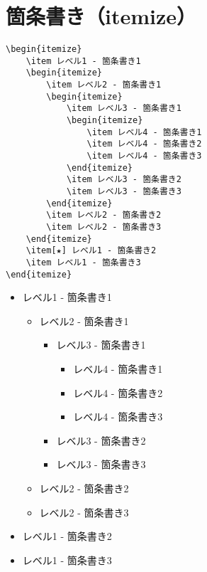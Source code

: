 \section{箇条書き（itemize）}

\begin{verbatim}
\begin{itemize}
    \item レベル1 - 箇条書き1
    \begin{itemize}
        \item レベル2 - 箇条書き1
        \begin{itemize}
            \item レベル3 - 箇条書き1
            \begin{itemize}
                \item レベル4 - 箇条書き1
                \item レベル4 - 箇条書き2
                \item レベル4 - 箇条書き3
            \end{itemize}
            \item レベル3 - 箇条書き2
            \item レベル3 - 箇条書き3
        \end{itemize}
        \item レベル2 - 箇条書き2
        \item レベル2 - 箇条書き3
    \end{itemize}
    \item[★] レベル1 - 箇条書き2
    \item レベル1 - 箇条書き3
\end{itemize}
\end{verbatim}

\begin{itemize}
    \item レベル1 - 箇条書き1
    \begin{itemize}
        \item レベル2 - 箇条書き1
        \begin{itemize}
            \item レベル3 - 箇条書き1
            \begin{itemize}
                \item レベル4 - 箇条書き1
                \item レベル4 - 箇条書き2
                \item レベル4 - 箇条書き3
            \end{itemize}
            \item レベル3 - 箇条書き2
            \item レベル3 - 箇条書き3
        \end{itemize}
        \item レベル2 - 箇条書き2
        \item レベル2 - 箇条書き3
    \end{itemize}
    \item レベル1 - 箇条書き2
    \item レベル1 - 箇条書き3
\end{itemize}

